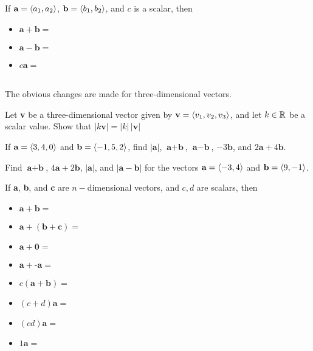\documentclass[notes]{subfiles}
\begin{document}
		\begin{rmk}
			If $\textbf{a} = \left\langle a_1,a_2\right\rangle$, $\textbf{b} = \left\langle b_1,b_2\right\rangle$, and $c$ is a scalar, then\\[10pt]
			\begin{itemize}
				\setlength\itemsep{15pt}
				
				\item $\textbf{a} + \textbf{b} = $
				\item $\textbf{a} - \textbf{b} = $
				\item $c\textbf{a} = $
			\end{itemize}\\[10pt]
			The obvious changes are made for three-dimensional vectors.
		\end{rmk}
		\begin{ex}
			Let \textbf{v} be a three-dimensional vector given by $\textbf{v} = \left\langle v_1,v_2,v_3\right\rangle$, and let $k\in \mathbb{R}$ be a scalar value.  Show that $|k\textbf{v}| = |k|\,|\textbf{v}|$
		\end{ex}
			
		\begin{ex}
			If $\textbf{a} = \left\langle 3,4,0\right\rangle$ and $\textbf{b} = \left\langle -1,5,2\right\rangle$, find $|\textbf{a}|$, $\textbf{a}+\textbf{b}$, $\textbf{a} - \textbf{b}$, $-3\textbf{b}$, and $2\textbf{a} + 4\textbf{b}$.
		\end{ex}	
			
		\begin{ex}
			Find $\textbf{a} + \textbf{b}$, $4\textbf{a}+2\textbf{b}$, $|\textbf{a}|$, and $|\textbf{a}-\textbf{b}|$ for the vectors $\textbf{a} = \left\langle -3,4\right\rangle$ and $\textbf{b} = \left\langle 9,-1\right\rangle$.
		\end{ex}
			\newpage
		
		\begin{rmk}
			If \textbf{a}, \textbf{b}, and \textbf{c} are $n-$dimensional vectors, and $c,d$ are scalars, then\\[15pt]
			\begin{itemize}
				\setlength\itemsep{15pt}
				\item $\textbf{a} + \textbf{b} =$ 
				\item $\textbf{a} + (\textbf{b} + \textbf{c}) = $
				\item $\textbf{a} + \textbf{0} =$ 
				\item $\textbf{a} + \textbf{-a}=$ 
				\item $c(\textbf{a} + \textbf{b}) =$ 
				\item $(c+d)\textbf{a} = $
				\item $(cd)\textbf{a} =$
				\item $1\textbf{a} = $
			\end{itemize}
		\end{rmk}
	
\end{document}
